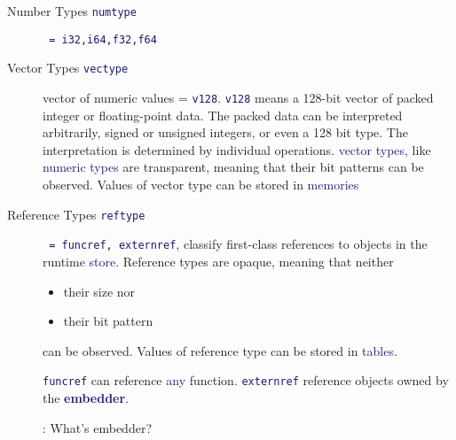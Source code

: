 \documentclass[dvipsnames]{article}
\newcommand{\mycola}{MidnightBlue}
\newcommand{\mycolb}{Mahogany}
\newcommand{\cola}[1]{\textcolor{\mycola}{#1}}
\newcommand{\colb}[1]{\textcolor{\mycolb}{#1}}
\newcommand{\Cola}[1]{\textcolor{\mycola}{\textbf{#1}}}
\begin{document}
\newcommand{\textmytype}[1]{\texttt{\cola{#1}}}
\begin{description}
\item[Number Types \textmytype{numtype}] \textmytype{ = i32,i64,f32,f64}
\item[Vector Types \textmytype{vectype}] vector of numeric values = \textmytype{v128}. \textmytype{v128}
  means a 128-bit vector of packed integer or floating-point data. The packed
  data can be interpreted arbitrarily, signed or unsigned integers, or even a
  128 bit type. The interpretation is determined by individual operations.
  \cola{vector types}, like \cola{numeric types} are \colb{transparent}, meaning
  that their bit patterns can be observed. Values of vector type can be stored
  in \cola{memories}
\item[Reference Types \textmytype{reftype}] \textmytype{ = funcref, externref}, classify
  first-class references to objects in the runtime \cola{store}. Reference types
  are \colb{opaque}, meaning that neither
  \begin{itemize}
  \item their size nor 
  \item their bit pattern
  \end{itemize}
  can be observed. Values of reference type can be stored in \cola{tables}.

  \textmytype{funcref} can reference \cola{any} function. \textmytype{externref}
  reference objects owned by the \Cola{embedder}.

   : What's embedder?


\end{description}
\end{document}
